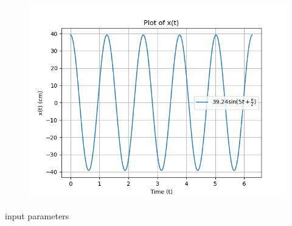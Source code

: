 \documentclass[journal,12pt,twocolumn]{IEEEtran}
\theoremstyle{remark}
\begin{document}
 \begin{figure}[h!]
    \centering
    \includegraphics[width = \columnwidth]{2023/XE/71/figs/xe_71_f2.png}
\end{figure}
 \begin{table}[!ht]
    \centering
        
    \caption{input parameters}
     \label{XE_71.t1}
\end{table}
\end{document}

